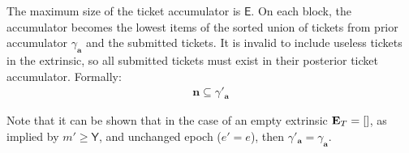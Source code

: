 The maximum size of the ticket accumulator is $\mathsf{E}$. On each block, the accumulator becomes the lowest items of the sorted union of tickets from prior accumulator $\gamma_\mathbf{a}$ and the submitted tickets. It is invalid to include useless tickets in the extrinsic, so all submitted tickets must exist in their posterior ticket accumulator. Formally:
\begin{align}
  \mathbf{n} \subseteq \gamma'_\mathbf{a}
\end{align}

Note that it can be shown that in the case of an empty extrinsic $\mathbf{E}_T = []$, as implied by $m' \ge \mathsf{Y}$, and unchanged epoch ($e' = e$), then $\gamma'_\mathbf{a} = \gamma_\mathbf{a}$.
